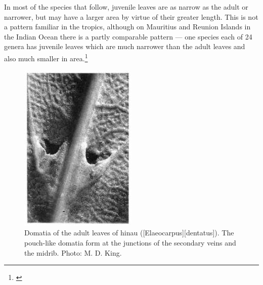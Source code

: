 In most of the species that follow, juvenile leaves are as narrow as the adult or narrower, but may have a larger area by virtue of their greater length.
This is not a pattern familiar in the tropics, although on Mauritius and Reunion Islands in the Indian Ocean there is a partly comparable pattern --- one species each of 24 genera has juvenile leaves which are much narrower than the adult leaves and also much smaller in area.\footnote{\cite{friedmann1976observations}}

\begin{figure}
	\includegraphics[width=0.5\textwidth]{graphics/figure23hinau.jpg}
	\centering
	\caption[Domatia of the adult leaves of hinau]{Domatia of the adult leaves of hinau ([Elaeocarpus][dentatus]).
The pouch-like domatia form at the junctions of the secondary veins and the midrib.
	Photo: M. D. King.}%
	\label{fig:23hinau}
\end{figure}

